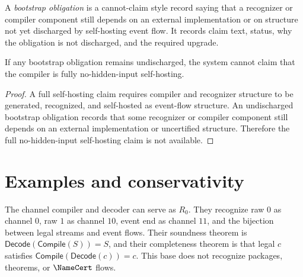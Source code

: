 \begin{definition}
\label{def:recognizer-generated-bootstrap-obligation}
A \emph{bootstrap obligation} is a cannot-claim style record saying that a recognizer or compiler component still depends on an external implementation or on structure not yet discharged by self-hosting event flow. It records claim text, status, why the obligation is not discharged, and the required upgrade.
\end{definition}

\begin{theorem}
\label{thm:recognizer-generated-bootstrap-obligation-blocks-claim}
If any bootstrap obligation remains undischarged, the system cannot claim that the compiler is fully no-hidden-input self-hosting.
\end{theorem}

\begin{proof}
A full self-hosting claim requires compiler and recognizer structure to be generated, recognized, and self-hosted as event-flow structure. An undischarged bootstrap obligation records that some recognizer or compiler component still depends on an external implementation or uncertified structure. Therefore the full no-hidden-input self-hosting claim is not available.
\end{proof}

\section{Examples and conservativity}
\label{sec:recognizer-generated-examples-conservativity}

\begin{example}
\label{ex:recognizer-generated-channel-base}
The channel compiler and decoder can serve as $R_0$. They recognize raw $0$ as channel $0$, raw $1$ as channel $10$, event end as channel $11$, and the bijection between legal streams and event flows. Their soundness theorem is $\mathsf{Decode}(\mathsf{Compile}(S))=S$, and their completeness theorem is that legal $c$ satisfies $\mathsf{Compile}(\mathsf{Decode}(c))=c$. This base does not recognize packages, theorems, or $\NameCert$ flows.
\end{example}

